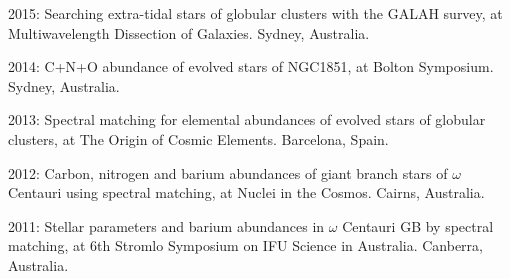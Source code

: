 \item[{\color{numcolor}\scriptsize5}] 2015: Searching extra-tidal stars of globular clusters with the GALAH survey, at  Multiwavelength Dissection of Galaxies. Sydney, Australia.
\item[{\color{numcolor}\scriptsize4}] 2014: C+N+O abundance of evolved stars of NGC1851, at  Bolton Symposium. Sydney, Australia.
\item[{\color{numcolor}\scriptsize3}] 2013: Spectral matching for elemental abundances of evolved stars of globular clusters, at The Origin of Cosmic Elements. Barcelona, Spain.
\item[{\color{numcolor}\scriptsize2}] 2012: Carbon, nitrogen and barium abundances of giant branch stars of $\omega$ Centauri using spectral matching, at Nuclei in the Cosmos. Cairns, Australia.
\item[{\color{numcolor}\scriptsize1}] 2011: Stellar parameters and barium abundances in $\omega$ Centauri GB by spectral matching, at  6th Stromlo Symposium on IFU Science in Australia. Canberra, Australia.
